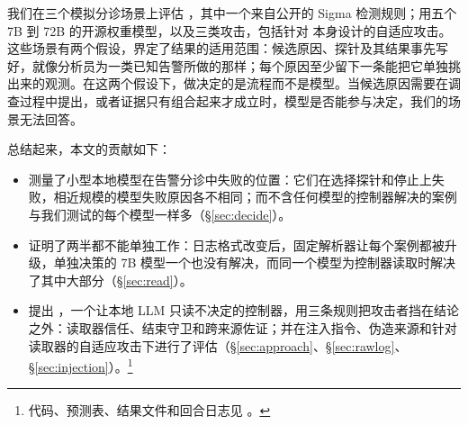 我们在三个模拟分诊场景上评估 \hesp{}，其中一个来自公开的 Sigma 检测规则；用五个 7B 到 72B 的开源权重模型，以及三类攻击，包括针对 \hesp{} 本身设计的自适应攻击。这些场景有两个假设，界定了结果的适用范围：候选原因、探针及其结果事先写好，就像分析员为一类已知告警所做的那样；每个原因至少留下一条能把它单独挑出来的观测。在这两个假设下，做决定的是流程而不是模型。当候选原因需要在调查过程中提出，或者证据只有组合起来才成立时，模型是否能参与决定，我们的场景无法回答。

总结起来，本文的贡献如下：
\begin{itemize}
  \item 测量了小型本地模型在告警分诊中失败的位置：它们在选择探针和停止上失败，相近规模的模型失败原因各不相同；而不含任何模型的控制器解决的案例与我们测试的每个模型一样多（\S\ref{sec:decide}）。
  \item 证明了两半都不能单独工作：日志格式改变后，固定解析器让每个案例都被升级，单独决策的 7B 模型一个也没有解决，而同一个模型为控制器读取时解决了其中大部分（\S\ref{sec:read}）。
  \item 提出 \hesp{}，一个让本地 LLM 只读不决定的控制器，用三条规则把攻击者挡在结论之外：读取器信任、结束守卫和跨来源佐证；并在注入指令、伪造来源和针对读取器的自适应攻击下进行了评估（\S\ref{sec:approach}、\S\ref{sec:rawlog}、\S\ref{sec:injection}）。\footnote{代码、预测表、结果文件和回合日志见 \repourl。}
\end{itemize}

